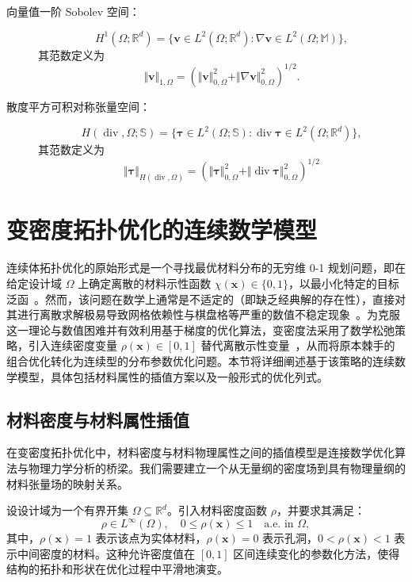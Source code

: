 \begin{description}
	\item[向量值一阶 Sobolev 空间：]
	\[
	H^1(\Omega;\mathbb{R}^d) = \{\boldsymbol{v}\in L^2(\Omega;\mathbb{R}^d) : \nabla\boldsymbol{v}\in L^2(\Omega;\mathbb{M})\},
	\] 
	其范数定义为 
	\[
	\Vert\boldsymbol{v}\Vert_{1,\Omega} = \left(\Vert\boldsymbol{v}\Vert^2_{0,\Omega} + \Vert\nabla\boldsymbol{v}\Vert^2_{0,\Omega}\right)^{1/2}.
	\]
	
	\item[散度平方可积对称张量空间：]
	\[
	H(\operatorname{div},\Omega;\mathbb{S}) = \big\{\boldsymbol{\tau}\in L^2(\Omega;\mathbb{S}) : \operatorname{div}\boldsymbol{\tau}\in L^2(\Omega;\mathbb{R}^d)\big\},
	\]
	其范数定义为 
	\[
	\Vert\boldsymbol{\tau}\Vert_{H(\operatorname{div},\Omega)} = \left(\Vert\boldsymbol{\tau}\Vert^2_{0,\Omega} + \Vert\operatorname{div}\boldsymbol{\tau}\Vert^2_{0,\Omega}\right)^{1/2}
	\]
\end{description}


\section{变密度拓扑优化的连续数学模型}
\label{sec:cont_models}

连续体拓扑优化的原始形式是一个寻找最优材料分布的无穷维 0-1 规划问题，即在给定设计域 $\Omega$ 上确定离散的材料示性函数 $\chi(\boldsymbol{x}) \in \{0, 1\}$，以最小化特定的目标泛函~\cite{bendsoeTopologyOptimization2004a}。然而，该问题在数学上通常是不适定的（即缺乏经典解的存在性），直接对其进行离散求解极易导致网格依赖性与棋盘格等严重的数值不稳定现象~\cite{kohnOptimalDesignRelaxation1986}。为克服这一理论与数值困难并有效利用基于梯度的优化算法，变密度法采用了数学松弛策略，引入连续密度变量 $\rho(\boldsymbol{x}) \in [0, 1]$ 替代离散示性变量~\cite{bendsoeOptimalShapeDesign1989a}，从而将原本棘手的组合优化转化为连续型的分布参数优化问题。本节将详细阐述基于该策略的连续数学模型，具体包括材料属性的插值方案以及一般形式的优化列式。


\subsection{材料密度与材料属性插值}
\label{subsec:material_interpolation}
在变密度拓扑优化中，材料密度与材料物理属性之间的插值模型是连接数学优化算法与物理力学分析的桥梁。我们需要建立一个从无量纲的密度场到具有物理量纲的材料张量场的映射关系。

设设计域为一个有界开集 $\Omega\subseteq\mathbb{R}^d$。引入材料密度函数 $\rho$，并要求其满足：
\[
\rho\in{L}^\infty(\Omega),\quad0\leq\rho(\boldsymbol{x})\leq1\quad \text{a.e. in } \Omega,
\]
其中，$\rho(\boldsymbol{x})=1$ 表示该点为实体材料，$\rho(\boldsymbol{x})=0$ 表示孔洞，$0<\rho(\boldsymbol{x})<1$ 表示中间密度的材料。这种允许密度值在 $[0,1]$ 区间连续变化的参数化方法，使得结构的拓扑和形状在优化过程中平滑地演变。

